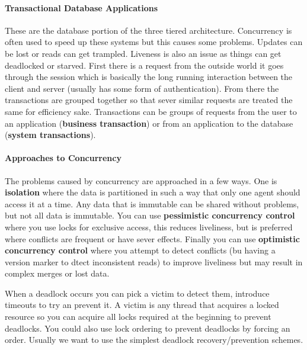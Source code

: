 \documentclass{article}
\begin{document}
\paragraph{Transactional Database Applications} %
\label{par:transactional_database_applications}
These are the database portion of the three tiered architecture. Concurrency is often used to speed up these systems but this causes some problems. Updates can be lost or reads can get trampled. Liveness is also an issue as things can get deadlocked or starved. First there is a request from the outside world it goes through the session which is basically the long running interaction between the client and server (usually has some form of authentication). From there the transactions are grouped together so that sever similar requests are treated the same for efficiency sake. Transactions can be groups of requests from the user to an application (\textbf{business transaction}) or from an application to the database (\textbf{system transactions}).

\paragraph{Approaches to Concurrency} %
\label{par:approaches_to_concurrency}
The problems caused by concurrency are approached in a few ways. One is \textbf{isolation} where the data is partitioned in such a way that only one agent should access it at a time. Any data that is immutable can be shared without problems, but not all data is immutable. You can use \textbf{pessimistic concurrency control} where you use locks for exclusive access, this reduces liveliness, but is preferred where conflicts are frequent or have sever effects. Finally you can use \textbf{optimistic concurrency control} where you attempt to detect conflicts (bu having a version marker to dtect inconsistent reads) to improve liveliness but may result in complex merges or lost data.

When a deadlock occurs you can pick a victim to detect them, introduce timeouts to try an prevent it. A victim is any thread that acquires a locked resource so you can acquire all locks required at the beginning to prevent deadlocks. You could also use lock ordering to prevent deadlocks by forcing an order. Usually we want to use the simplest deadlock recovery/prevention schemes.
\end{document}

